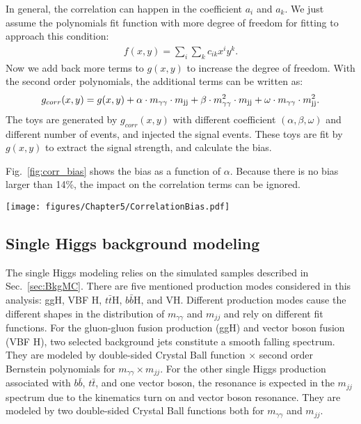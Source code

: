 In general, the correlation can happen in the coefficient $a_{i}$ and $a_{k}$.
We just assume the polynomials fit function with more degree of freedom for fitting to approach this condition:
\begin{equation} \label{eq:2DfitFuncGeneral}
  \begin{aligned}
	f(x,y) = \sum_{i}\sum_{k}c_{ik}x^{i}y^{k}.
  \end{aligned}
\end{equation}
Now we add back more terms to $g(x,y)$ to increase the degree of freedom.
With the second order polynomials, the additional terms can be written as:
\begin{equation} \label{eq:2DfitFuncOriCor}
  \begin{aligned}
	g_{corr}(x,y) = g(x,y) + \alpha\cdot m_{\gamma\gamma}\cdot m_{\rm jj} + \beta\cdot m_{\gamma\gamma}^{2}\cdot m_{\rm jj}+ \omega\cdot m_{\gamma\gamma}\cdot m_{\rm jj}^{2}.
  \end{aligned}
\end{equation}
The toys are generated by $g_{corr}(x,y)$ with different coefficient $(\alpha, \beta, \omega)$ and different number of events, and injected the signal events.
These toys are fit by $g(x,y)$ to extract the signal strength, and calculate the bias.

Fig.~\ref{fig:corr_bias} shows the bias as a function of $\alpha$.
Because there is no bias larger than 14\%,
the impact on the correlation terms can be ignored.

\begin{figure*}[h]
  \centering
\texttt{[image: figures/Chapter5/CorrelationBias.pdf]}
\caption{The average bias on measuring the signal with $g(m_{\gamma\gamma},m_{jj})$ on toys created by $g_{corr}(m_{\gamma\gamma},m_{jj})$ with $\alpha$ from 0 to 1.}
\label{fig:corr_bias}
\end{figure*}


\subsection{Single Higgs background modeling} \label{sec:SingleHModling}

The single Higgs modeling relies on the simulated samples described in Sec.~\ref{sec:BkgMC}.
There are five mentioned production modes considered in this analysis: ggH, VBF H, $t\bar{t}$H, $b\bar{b}$H, and VH.
Different production modes cause the different shapes in the distribution of $m_{\gamma\gamma}$ and $m_{jj}$ and rely on different fit functions.
For the gluon-gluon fusion production (ggH) and vector boson fusion (VBF H), two selected background jets constitute a smooth falling spectrum.
They are modeled by double-sided Crystal Ball function $\times$ second order Bernstein polynomials for $m_{\gamma\gamma} \times m_{jj}$.
For the other single Higgs production associated with $b\bar{b}$, $t\bar{t}$, and one vector boson, 
the resonance is expected in the $m_{jj}$ spectrum due to the kinematics turn on and vector boson resonance. %
They are modeled by two double-sided Crystal Ball functions both for $m_{\gamma\gamma}$ and $m_{jj}$.

